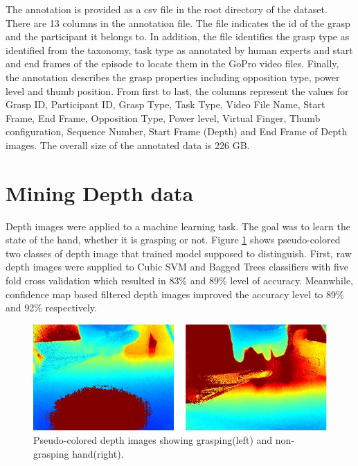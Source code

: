 \documentclass[journal]{IEEEtran}
\begin{document}
The annotation is provided as a csv file in the root directory of the dataset. There are 13 columns in the annotation file. The file indicates the id of the grasp and the participant it belongs to. In addition, the file identifies the grasp type as identified from the taxonomy, task type as annotated by human experts and start and end frames of the episode to locate them in the GoPro video files. Finally, the annotation describes the grasp properties including opposition type, power level and thumb position. From first to last, the columns represent the values for Grasp ID, Participant ID, Grasp Type, Task Type,  Video File Name, Start Frame, End Frame, Opposition Type, Power level, Virtual Finger, Thumb configuration, Sequence Number, Start Frame (Depth) and End Frame of Depth images. The overall size of the annotated data is 226 GB.


\section{Mining Depth data}

Depth images were applied to a machine learning task. The goal was to learn the state of the hand, whether it is grasping or not. Figure \ref{fig:GraspingNonGrasping} shows pseudo-colored two classes of depth image that trained model supposed to distinguish. First, raw depth images were supplied to Cubic SVM and Bagged Trees classifiers with five fold cross validation which resulted in 83\% and 89\% level of accuracy. Meanwhile, confidence map based filtered depth images improved the accuracy level to 89\% and 92\% respectively. 


\begin{figure}
\includegraphics[scale = 1.3]{GraspingNonGrasping}
\caption{Pseudo-colored depth images showing grasping(left) and non-grasping hand(right). }
\label{fig:GraspingNonGrasping}
\centering
\end{figure}
\end{document}
